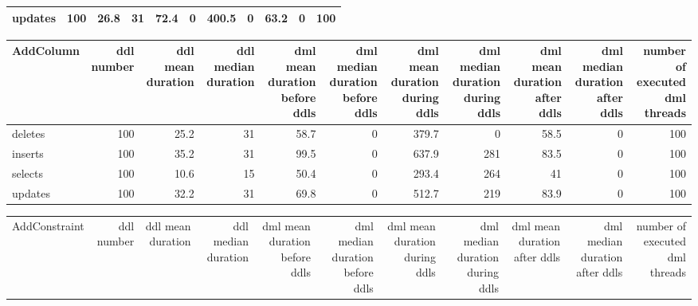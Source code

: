 \begin{tabular}{lrrrrrrrrrr}
 updates                   &          100 &                26.8 &                    31 &                            72.4 &                                 0 &                           400.5 &                                 0 &                           63.2 &                                0 &                              100 \\
\hline
\end{tabular}\begin{tabular}{lrrrrrrrrrr}
\hline
 AddColumn   &   ddl number &   ddl mean duration &   ddl median duration &   dml mean duration before ddls &   dml median duration before ddls &   dml mean duration during ddls &   dml median duration during ddls &   dml mean duration after ddls &   dml median duration after ddls &   number of executed dml threads \\
\hline
 deletes     &          100 &                25.2 &                    31 &                            58.7 &                                 0 &                           379.7 &                                 0 &                           58.5 &                                0 &                              100 \\
 inserts     &          100 &                35.2 &                    31 &                            99.5 &                                 0 &                           637.9 &                               281 &                           83.5 &                                0 &                              100 \\
 selects     &          100 &                10.6 &                    15 &                            50.4 &                                 0 &                           293.4 &                               264 &                           41   &                                0 &                              100 \\
 updates     &          100 &                32.2 &                    31 &                            69.8 &                                 0 &                           512.7 &                               219 &                           83.9 &                                0 &                              100 \\
\hline
\end{tabular}\begin{tabular}{lrrrrrrrrrr}
\hline
 AddConstraint   &   ddl number &   ddl mean duration &   ddl median duration &   dml mean duration before ddls &   dml median duration before ddls &   dml mean duration during ddls &   dml median duration during ddls &   dml mean duration after ddls &   dml median duration after ddls &   number of executed dml threads \\

\end{tabular}
